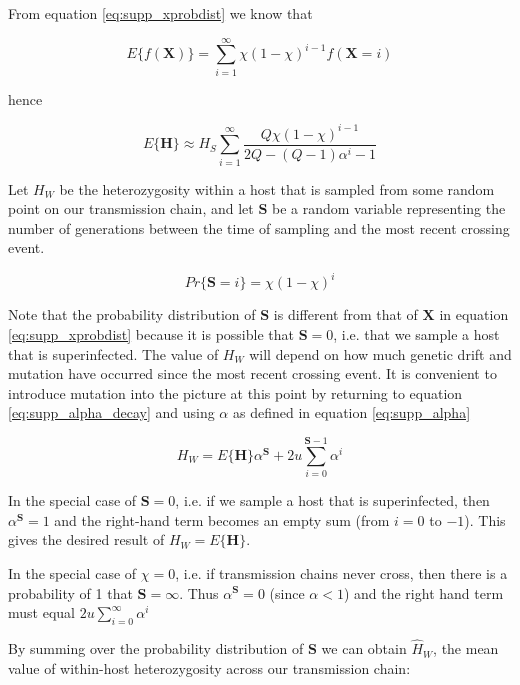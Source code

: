 \documentclass[_main.tex]{subfiles}
\begin{document}
From equation \ref{eq:supp_xprobdist} we know that

\begin{equation*}
E \{ f(\textbf{X}) \} = \sum_{i=1}^\infty \chi (1-\chi) ^{i-1} f( \textbf{X} = i)
\end{equation*}

hence

\begin{equation*}
E \{ \textbf{H} \}  
\approx H_S \sum_{i=1}^\infty \frac{ Q \chi (1-\chi) ^{i-1}}{2Q - (Q -1)\alpha^i - 1} 
\end{equation*}

Let $H_W$ be the heterozygosity within a host that is sampled from some random point on our transmission chain, and let $\mathbf{S}$ be a random variable representing the number of generations between the time of sampling and the most recent crossing event.

\begin{equation*}
Pr \{ \textbf{S} = i \} = \chi (1- \chi)^{i}
\end{equation*}

Note that the probability distribution of $\mathbf{S}$ is different from that of $\mathbf{X}$ in equation \ref{eq:supp_xprobdist} because it is possible that $\mathbf{S} = 0$, i.e. that we sample a host that is superinfected.  The value of $H_W$ will depend on how much genetic drift and mutation have occurred since the most recent crossing event.  It is convenient to introduce mutation into the picture at this point by returning to equation \ref{eq:supp_alpha_decay} and using $\alpha$ as defined in equation \ref{eq:supp_alpha}

\begin{equation*}
H_W = E \{ \textbf{H} \} \alpha^\mathbf{S} + 2u \sum_{i=0}^{\mathbf{S}-1} \alpha^i
\end{equation*}

In the special case of $\mathbf{S}=0$, i.e. if we sample a host that is superinfected, then $\alpha^\textbf{S} = 1$ and the right-hand term becomes an empty sum (from $i=0$ to $-1$).  This gives the desired result of $H_W = E \{\textbf{H} \}$.

In the special case of $\chi=0$, i.e. if transmission chains never cross, then there is a probability of 1 that $\textbf{S} = \infty$.  Thus $\alpha^\textbf{S} = 0$ (since $\alpha <1$) and the right hand term must equal $2u \sum_{i=0}^\infty \alpha^i$

By summing over the probability distribution of $\mathbf{S}$ we can obtain $\widehat{H}_W$, the mean value of within-host heterozygosity across our transmission chain: 
\end{document}
